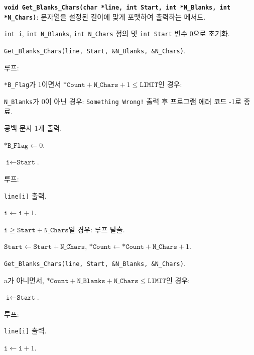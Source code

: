 \textbf{\texttt{void Get_Blanks_Chars(char *line, int Start, int *N_Blanks, int *N_Chars)}}: 문자열을 설정된 길이에 맞게 포맷하여 출력하는 메서드.
\begin{algorithm}
	\item \texttt{int i}, \texttt{int N_Blanks}, \texttt{int N_Chars} 정의 및 \texttt{int Start} 변수 0으로 초기화.
	\item \texttt{Get_Blanks_Chars(line, Start, \&N_Blanks, \&N_Chars)}.
	\item 루프:
			\begin{algorithm}
				\item \texttt{*B_Flag}가 1이면서 $\texttt{*Count} + \texttt{N_Chars} + 1 \leq \texttt{LIMIT}$인 경우:
					\begin{algorithm}
						\item \texttt{N_Blanks}가 0이 아닌 경우: \texttt{Something Wrong!} 출력 후 프로그램 에러 코드 -1로 종료.
						\item 공백 문자 1개 출력.
						\item $\texttt{*B_Flag} \leftarrow 0$.
						\item $\texttt{i} \leftarrow \texttt{Start}$.
						\item 루프:
							\begin{algorithm}
								\item \texttt{line[i]} 출력.
								\item $\texttt{i} \leftarrow \texttt{i} + 1$.
								\item $\texttt{i} \geq \texttt{Start} + \texttt{N_Chars}$일 경우: 루프 탈출.
							\end{algorithm}
						\item $\texttt{Start} \leftarrow \texttt{Start} + \texttt{N_Chars}$, $\texttt{*Count} \leftarrow \texttt{*Count} + \texttt{N_Chars} + 1$.
						\item \texttt{Get_Blanks_Chars(line, Start, \&N_Blanks, \&N_Chars)}.
 					\end{algorithm}
 				\item a가 아니면서, $\texttt{*Count} + \texttt{N_Blanks} + \texttt{N_Chars} \leq \texttt{LIMIT}$인 경우:
 					\begin{algorithm}
						\item $\texttt{i} \leftarrow \texttt{Start}$.
						\item 루프:
							\begin{algorithm}
								\item \texttt{line[i]} 출력.
								\item $\texttt{i} \leftarrow \texttt{i} + 1$.

\end{algorithm}
\end{algorithm}
\end{algorithm}
\end{algorithm}
